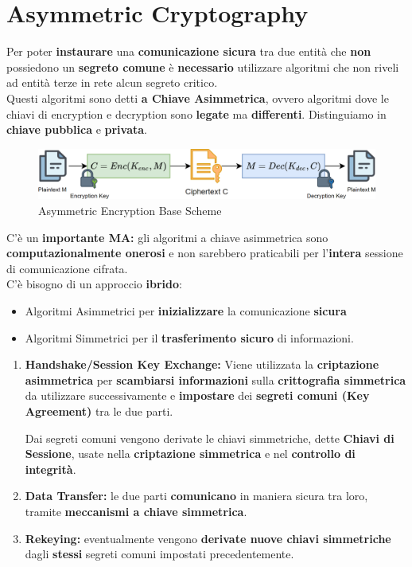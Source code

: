 \chapter{Asymmetric Cryptography}
Per poter \textbf{instaurare} una \textbf{comunicazione sicura} tra due entità che \textbf{non} possiedono un \textbf{segreto comune} è \textbf{necessario} utilizzare algoritmi che non riveli ad entità terze in rete alcun segreto critico.\\
Questi algoritmi sono detti \textbf{a Chiave Asimmetrica}, ovvero algoritmi dove le chiavi di encryption e decryption sono \textbf{legate} ma \textbf{differenti}. Distinguiamo in \textbf{chiave pubblica} e \textbf{privata}.
\begin{figure}[h]
    \centering
    \includegraphics{image/asimmcrypto.png}
    \caption{Asymmetric Encryption Base Scheme}
    \label{fig:asymmcrypto}
\end{figure}
C'è un \textbf{importante MA:} gli algoritmi a chiave asimmetrica sono \textbf{computazionalmente onerosi} e non sarebbero praticabili per l'\textbf{intera} sessione di comunicazione cifrata.\\
C'è bisogno di un approccio \textbf{ibrido}:
\begin{itemize}
    \item Algoritmi Asimmetrici per \textbf{inizializzare} la comunicazione \textbf{sicura}
    \item Algoritmi Simmetrici per il \textbf{trasferimento sicuro} di informazioni.
\end{itemize}
\begin{definition}
\begin{enumerate}
    \item \textbf{Handshake/Session Key Exchange:} Viene utilizzata la \textbf{criptazione asimmetrica} per \textbf{scambiarsi informazioni} sulla \textbf{crittografia simmetrica} da utilizzare successivamente e \textbf{impostare} dei \textbf{segreti comuni (Key Agreement)} tra le due parti.\\
    \begin{remark}
    Dai segreti comuni vengono derivate le chiavi simmetriche, dette \textbf{Chiavi di Sessione}, usate nella\textbf{ criptazione simmetrica} e nel \textbf{controllo di integrità}.
    \end{remark}
    \item \textbf{Data Transfer:} le due parti \textbf{comunicano} in maniera sicura tra loro, tramite \textbf{meccanismi a chiave simmetrica}.
    \item \textbf{Rekeying:} eventualmente vengono \textbf{derivate nuove chiavi simmetriche} dagli \textbf{stessi} segreti comuni impostati precedentemente.
\end{enumerate}
\end{definition}
